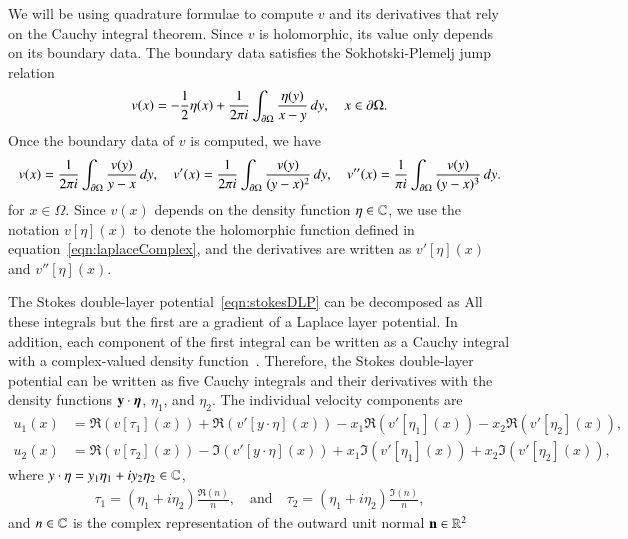\documentclass[preprint, 10pt]{elsarticle}
\begin{document}
We will be using quadrature formulae to compute $v$ and its derivatives
that rely on the Cauchy integral theorem.  Since $v$ is holomorphic, its
value only depends on its boundary data.  The boundary data satisfies
the Sokhotski-Plemelj jump relation
\begin{align}
  \label{eqn:SPrelation}
  v(x) = -\frac{1}{2} \eta(x) + \frac{1}{2\pi i} \int_{{\partial}\Omega}
    \frac{\eta(y)}{x-y}\, dy, \quad x \in {\partial}\Omega.
\end{align}
Once the boundary data of $v$ is computed, we have
\begin{align}
  \label{eqn:cauchy}
  v(x) = \frac{1}{2\pi i}\int_{{\partial}\Omega} 
    \frac{v(y)}{y-x} \,dy, \quad
  v'(x) = \frac{1}{2\pi i} \int_{{\partial}\Omega}
    \frac{v(y)}{(y-x)^2} \, dy, \quad
  v''(x) = \frac{1}{\pi i} \int_{{\partial}\Omega}
    \frac{v(y)}{(y-x)^3} \, dy.
\end{align}
for $x \in \Omega$.  Since $v(x)$ depends on the density function $\eta
\in {\mathbb{C}}$, we use the notation $v[\eta](x)$ to denote the holomorphic
function defined in equation~\eqref{eqn:laplaceComplex}, and the
derivatives are written as $v'[\eta](x)$ and $v''[\eta](x)$.


The Stokes double-layer potential~\eqref{eqn:stokesDLP} can be
decomposed as
All these integrals but the first are a gradient of a Laplace layer
potential.  In addition, each component of the first integral can be
written as a Cauchy integral with a complex-valued density
function~\cite{bar-wu-vee2015}.  Therefore, the Stokes double-layer
potential can be written as five Cauchy integrals and their derivatives
with the density functions ${\mathbf{y}} \cdot {\boldsymbol\eta}$, $\eta_1$, and $\eta_2$.
The individual velocity components are
\begin{align}
  \label{eqn:cauchy1}
  u_1(x) &= \Re (v[\tau_1](x)) + \Re (v'[y\cdot\eta](x)) 
           -x_1\Re (v'[\eta_1](x)) - x_2\Re (v'[\eta_2](x)), \\
  u_2(x) &= \Re (v[\tau_2](x)) - \Im (v'[y\cdot\eta](x)) 
       +x_1\Im (v'[\eta_1](x)) + x_2\Im (v'[\eta_2](x)),
\end{align}
where $y \cdot \eta = y_1 \eta_1 + i y_2 \eta_2 \in {\mathbb{C}}$, 
\begin{align} 
  \tau_1=(\eta_1+i\eta_2)\frac{\Re(n)}{n}, \quad \text{and} \quad
  \tau_2=(\eta_1+i\eta_2)\frac{\Im(n)}{n},
\end{align}
and $n \in {\mathbb{C}}$ is the complex representation of the outward unit normal
${\mathbf{n}} \in {\mathbb{R}}^2$

\end{document}
